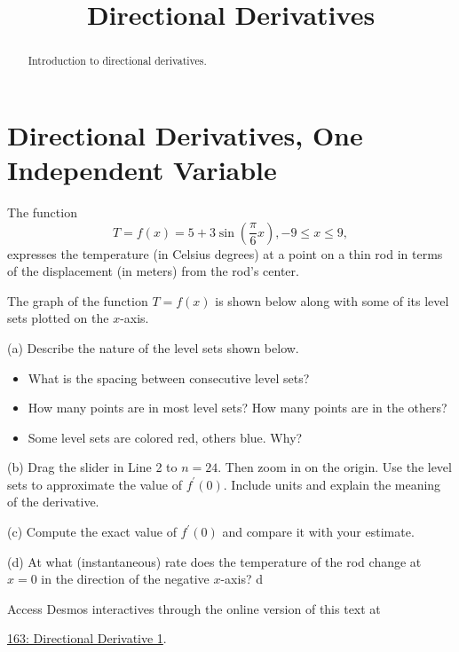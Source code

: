 \documentclass{ximera}
\title{Directional Derivatives}
\begin{document}
\begin{abstract}
Introduction to directional derivatives.
\end{abstract}
\maketitle


\section{Directional Derivatives, One Independent Variable}

\begin{question}  \label{Qdsdfsddsf6bd}

The function
\[
   T = f(x) = 5 + 3\sin \left(   \frac{\pi}{6}x  \right)   , -9\leq x \leq 9 ,
\]
expresses the temperature (in Celsius degrees) at a point on a thin rod in terms of the displacement (in meters) from the rod's center.

The graph of the function $T=f(x)$ is shown below along with some of its level sets plotted on the $x$-axis.

(a) Describe the nature of the level sets shown below.


\begin{itemize}

\item{What is the spacing between consecutive level sets?}

\item{How many points are in most level sets? How many points are in the others?} 

\item{Some level sets are colored red, others blue. Why?}

\end{itemize}

(b) Drag the slider in Line 2 to $n=24$. Then zoom in on the origin. Use the level sets to approximate the value of $f^\prime(0)$. Include units and explain the meaning of the derivative.

(c) Compute the exact value of $f^\prime(0)$ and compare it with your estimate.

(d) At what (instantaneous) rate does the temperature of the rod change at $x=0$ in the direction of the negative $x$-axis? 
d
 
\begin{onlineOnly}
    \begin{center}
\end{center}
\end{onlineOnly}

Access Desmos interactives through the online version of this text at
 
\href{https://www.desmos.com/calculator/1ztmnpaymf}{163: Directional Derivative 1}.
\end{question}
\end{document}
